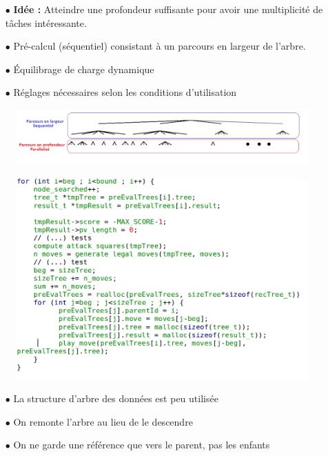 \documentclass[usepdftitle=false,green]{beamer}
\begin{document}
\begin{frame}
    \begin{itemize}
        \item[$\bullet$] \textbf{Idée : } Atteindre une profondeur suffisante pour avoir une multiplicité de tâches intéressante.
        \item[$\bullet$] Pré-calcul (séquentiel) consistant à un parcours en largeur de l'arbre.
        \item[$\bullet$] \'Equilibrage de charge dynamique
        \item[$\bullet$] {\color{red} Réglages nécessaires selon les conditions d'utilisation}
    \end{itemize}
    \vspace{5ex}
    \begin{center}
        \begin{figure}
            \includegraphics[scale=0.4]{pics/tree.png}
        \end{figure}
    \end{center}
\end{frame}

\begin{frame}
    \begin{center}
        \begin{figure}
            \includegraphics[scale=0.2]{pics/code4.png}
        \end{figure}
        \begin{itemize}
            \item[$\bullet$] La structure d'arbre des données est peu utilisée
            \item[$\bullet$] On remonte l'arbre au lieu de le descendre
            \item[$\bullet$] On ne garde une référence que vers le parent, pas les enfants
        \end{itemize}
    \end{center}
\end{frame}
\end{document}
